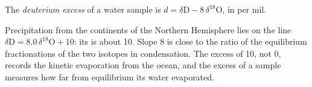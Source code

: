 \begin{definition}\label{def:b3:stable-isotopes:d-excess}
The \emph{deuterium excess} of a water sample is $d =
\delta\mathrm D - 8\,\delta^{18}\mathrm O$, in per mil.
\end{definition}

Precipitation from the continents of the Northern Hemisphere lies on the line
$\delta\mathrm D = 8.0\,\delta^{18}\mathrm O + 10$: its  is about
\qty{10}{\permil}. Slope 8 is close to the ratio of the equilibrium
fractionations of the two isotopes in condensation. The excess of 10, not 0,
records the kinetic evaporation from the ocean, and the excess of a sample
measures how far from equilibrium its water evaporated.


